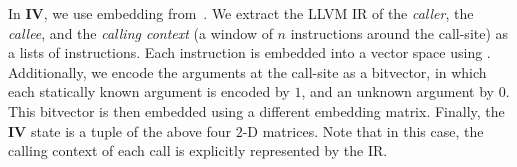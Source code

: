 

In \textbf{IV}, we use \insttovec embedding from~\cite{inst2vec}. We extract the LLVM IR
of the \emph{caller}, the \emph{callee}, and the \emph{calling context} (a window of
$n$ instructions around the call-site) as a lists of instructions. Each
instruction is embedded into a vector space using \insttovec. Additionally, we
encode the arguments at the call-site as a bitvector, in which each statically
known argument  is encoded by $1$, and an unknown argument by $0$. This
bitvector is then embedded using a different embedding matrix.
Finally, the \textbf{IV} state is a tuple of the above four $2$-D matrices. 
Note that in this case,
the calling context of each call is explicitly represented by the IR.




  



